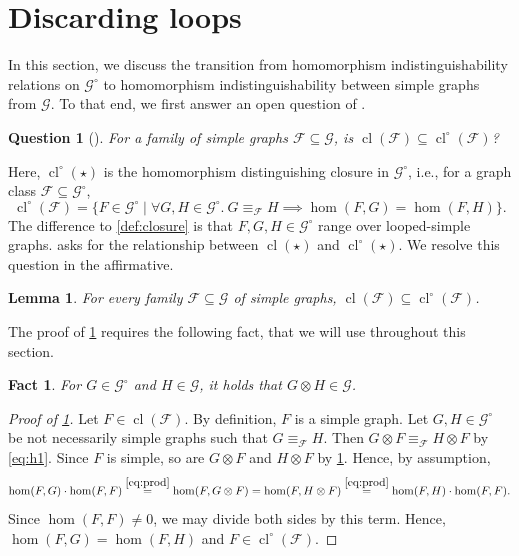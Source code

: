 \documentclass[11pt]{scrartcl}
\theoremstyle{definition}
\theoremstyle{plain}
\newtheorem{lemma}[definition]{Lemma}
\newtheorem{question}[definition]{Question}
\newtheorem{fact}[definition]{Fact}
\theoremstyle{remark}
\DeclareMathOperator{\cl}{cl}
\newcommand{\lG}{\mathcal{G}^\circ}
\newcommand{\G}{\mathcal{G}}
\begin{document}
	
	



\section{Discarding loops} \label{sec:loops}

In this section, we discuss the transition from homomorphism indistinguishability relations on $\lG$ to homomorphism indistinguishability between simple graphs from $\G$.
To that end, we first answer an open question of \textcite{roberson_oddomorphisms_2022}.

\begin{question}[{\textcite[Question~1]{roberson_oddomorphisms_2022}}]
    For a family of simple graphs $\mathcal{F} \subseteq \G$,
    is  $\cl(\mathcal{F}) \subseteq \cl^\circ(\mathcal{F})$?\label{question:rob1}
\end{question}

Here, $\cl^\circ(\star)$ is the homomorphism distinguishing closure in $\lG$, i.e., for a graph class $\mathcal{F} \subseteq \lG$,
\[
\cl^\circ(\mathcal{F}) = \{F \in \lG \mid \forall G, H \in \lG.\ G \equiv_{\mathcal{F}} H \implies \hom(F, G) = \hom(F, H)\}.
\]
The difference to \cref{def:closure} is that $F, G, H \in \lG$ range over looped-simple graphs.
 asks for the relationship between $\cl(\star)$ and $\cl^\circ(\star)$.
We resolve this question in the affirmative. 

\begin{lemma}\label{lem:roberson-question}
	For every family $\mathcal{F} \subseteq \G$ of simple graphs,
	$\cl(\mathcal{F}) \subseteq \cl^\circ(\mathcal{F})$.
\end{lemma}

The proof of \cref{lem:roberson-question} requires the following fact, that we will use throughout this section.
\begin{fact}\label{fact:drop-loops}
    For $G \in \lG$ and $H \in \G$, it holds that $G \otimes H \in \G$.
\end{fact}

\begin{proof}[Proof of \cref{lem:roberson-question}]
	Let $F \in \cl(\mathcal{F})$.
	By definition, $F$ is a simple graph.
	Let $G, H \in \lG$ be not necessarily simple graphs such that $G \equiv_{\mathcal{F}} H$.
	Then $G \otimes F \equiv_{\mathcal{F}} H \otimes F$ by \eqref{eq:h1}.
	Since $F$ is simple, so are $G \otimes F$ and $H \otimes F$ by \cref{fact:drop-loops}.
	Hence, by assumption,
	\[
		\hom(F, G) \cdot \hom(F, F)
		\overset{\eqref{eq:prod}}{=} \hom(F, G\otimes F)
		= \hom(F, H \otimes F)
		\overset{\eqref{eq:prod}}{=} \hom(F, H) \cdot \hom(F, F). 
	\]
	Since $\hom(F, F) \neq 0$, we may divide both sides by this term.
	Hence, $\hom(F, G) = \hom(F, H)$ and $F \in \cl^\circ(\mathcal{F})$.
\end{proof}
\end{document}
